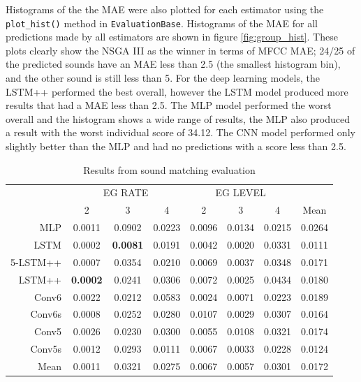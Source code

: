 Histograms of the the MAE were also plotted for each estimator using the \texttt{plot_hist()} method in \texttt{EvaluationBase}. Histograms of the MAE for all predictions made by all estimators are shown in figure \ref{fig:group_hist}. These plots clearly show the NSGA III as the winner in terms of MFCC MAE; 24/25 of the predicted sounds have an MAE less than 2.5 (the smallest histogram bin), and the other sound is still less than 5. For the deep learning models, the LSTM++ performed the best overall, however the LSTM model produced more results that had a MAE less than 2.5. The MLP model performed the worst overall and the histogram shows a wide range of results, the MLP also produced a result with the worst individual score of 34.12. The CNN model performed only slightly better than the MLP and had no predictions with a score less than 2.5.

\begin{table}[t]
\centering
\caption{Results from sound matching evaluation}
\label{tbl:param_eval_eg}
\begin{tabular}{r|ccc|ccc|c}
\toprule
{} & \multicolumn{3}{c}{EG RATE} & \multicolumn{3}{c}{EG LEVEL} & {} \\
{} & 2 & 3 & 4 & 2 & 3 & 4 & Mean \\
\midrule
MLP      &     0.0011 &     0.0902 &     0.0223 &      0.0096 &      0.0134 &      0.0215 &   0.0264 \\
LSTM     &     0.0002 &     \textbf{0.0081} &     0.0191 &      0.0042 &      0.0020 &      0.0331 &   0.0111 \\
5-LSTM++ &     0.0007 &     0.0354 &     0.0210 &      0.0069 &      0.0037 &      0.0348 &   0.0171 \\
LSTM++   &     \textbf{0.0002} &     0.0241 &     0.0306 &      0.0072 &      0.0025 &      0.0434 &   0.0180 \\
Conv6    &     0.0022 &     0.0212 &     0.0583 &      0.0024 &      0.0071 &      0.0223 &   0.0189 \\
Conv6s   &     0.0008 &     0.0252 &     0.0280 &      0.0107 &      0.0029 &      0.0307 &   0.0164 \\
Conv5    &     0.0026 &     0.0230 &     0.0300 &      0.0055 &      0.0108 &      0.0321 &   0.0174 \\
Conv5s   &     0.0012 &     0.0293 &     0.0111 &      0.0067 &      0.0033 &      0.0228 &   0.0124 \\
\midrule
Mean  &     0.0011 &     0.0321 &     0.0275 &      0.0067 &      0.0057 &      0.0301 &   0.0172 \\
\bottomrule
\end{tabular}
\end{table}


